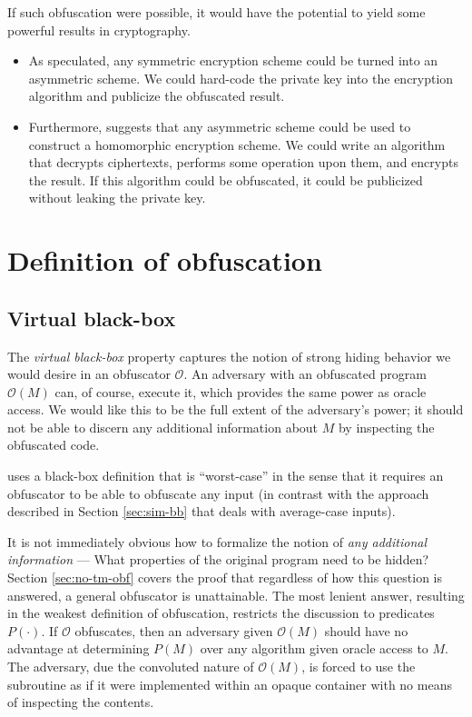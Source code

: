 \documentclass[10pt,twocolumn]{article}
\def\obf{\ensuremath{\mathcal{O}}}
\begin{document}
    If such obfuscation were possible, it would have the potential to yield some powerful results in cryptography.
    \begin{itemize}

      \item
        As \cite{newDirections} speculated, any symmetric encryption scheme could be turned into an asymmetric scheme.
        We could hard-code the private key into the encryption algorithm and publicize the obfuscated result.

      \item
        Furthermore, \cite{onThe(Im)possibility} suggests that any asymmetric scheme could be used to construct
        a homomorphic encryption scheme.
        We could write an algorithm that decrypts ciphertexts, performs some operation upon them, and
        encrypts the result.
        If this algorithm could be obfuscated, it could be publicized without leaking the private key.

    \end{itemize}

  \section{Definition of obfuscation}

  \subsection{Virtual black-box}

    The \textit{virtual black-box} property captures the notion of strong hiding behavior we would desire
    in an obfuscator $\obf$.
    An adversary with an obfuscated program $\obf(M)$ can, of course, execute it, which provides the same
    power as oracle access.
    We would like this to be the full extent of the adversary's power; it should not be able to discern
    any additional information about $M$ by inspecting the obfuscated code.

    \cite{onThe(Im)possibility} uses a black-box definition that is ``worst-case'' in the sense that
    it requires an obfuscator to be able to obfuscate any input (in contrast with the approach described
    in Section \ref{sec:sim-bb} that deals with average-case inputs).

    It is not immediately obvious how to formalize the notion of \textit{any additional information} ---
    What properties of the original program need to be hidden?
    Section \ref{sec:no-tm-obf} covers the proof that regardless of how this question is answered,
    a general obfuscator is unattainable.
    The most lenient answer, resulting in the weakest definition of obfuscation, restricts the discussion
    to predicates $P(\cdot)$. If $\obf$ obfuscates, then an adversary given $\obf(M)$ should have no advantage
    at determining $P(M)$ over any algorithm given oracle access to $M$.
    The adversary, due the convoluted nature of $\obf(M)$, is forced to use the subroutine as if it were
    implemented within an opaque container with no means of inspecting the contents.
\end{document}
